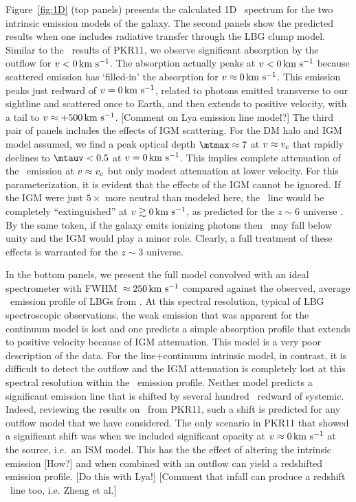 \documentclass[12pt,preprint]{aastex}
\begin{document}
Figure~\ref{fig:1D} (top panels) presents the 
calculated 1D \lya\ spectrum for the
two intrinsic emission models of the galaxy.
The second panels show the predicted results when one includes
radiative transfer through the LBG clump model.  Similar to the \mgii\
results of PKR11, we observe significant absorption by the outflow for
$v < 0\, {\rm km~s^{-1}}$.  The absorption actually peaks at $v < 0\, {\rm km~s^{-1}}$ because
scattered emission has `filled-in' the absorption for $v \approx 0
\, {\rm km~s^{-1}}$.  This emission peaks just redward of $v=0\, {\rm km~s^{-1}}$, related to
photons emitted transverse to our sightline and scattered once to
Earth, and then extends to positive velocity, with a tail to $v
\approx +500\, {\rm km~s^{-1}}$.  [Comment on Lya emission line model?]
The third pair of panels includes the effects of IGM scattering.  For
the DM halo and IGM model assumed, we find a peak optical depth
$\mtmax \approx 7$ at $v \approx v_{\rm c}$ that rapidly declines to
$\mtauv < 0.5$ at $v=0\, {\rm km~s^{-1}}$.  This implies complete attenuation of
the \lya\ emission at $v \approx v_{\rm c}$ but only modest
attenuation at lower velocity.  For this parameterization, it is evident that
the effects of the IGM cannot be ignored.  If the IGM were just $5
\times$ more neutral than modeled here, the \lya\ line would be
completely ``extinguished'' at $v \gtrsim 0 \, {\rm km~s^{-1}}$, as predicted for
the $z \sim 6$ universe \citep{zheng+10a}.  By the same token, if the
galaxy emits ionizing photons then \tmax\ may fall below unity and the
IGM would play a minor role.  Clearly, a full treatment of these
effects is warranted for the $z \sim 3$ universe.

In the bottom panels, we present the full model convolved with an
ideal spectrometer with FWHM~$\approx 250\, {\rm km~s^{-1}}$ compared against the
observed, average \lya\ emission profile of LBGs from
\cite{shapley03}.  
At this spectral resolution,
typical of LBG spectroscopic observations, the weak emission that was
apparent for the continuum model is lost and one predicts a simple
absorption profile that extends to positive velocity because of IGM
attenuation.  This model is a very poor description of the data.  
For the line+continuum intrinsic model, in contrast, it is difficult
to detect the outflow and the IGM attenuation is completely lost at
this spectral resolution within the \lya\ emission profile.
Neither model predicts a significant emission line that is shifted by
several hundred \kms\ redward of systemic.  Indeed, reviewing the
results on \mgii\ from PKR11, such a shift is predicted for any
outflow model that we have considered.  The only scenario in PKR11
that showed a significant shift was when we included significant
opacity at $v \approx 0 \, {\rm km~s^{-1}}$ at the source, i.e.\ an ISM model.
This has the the effect of altering the intrinsic emission [How?] 
and when combined with an outflow can yield a redshifted emission
profile.  [Do this with Lya!] 
[Comment that infall can produce a redshift \lya\ line too, i.e. Zheng
et al.]
\end{document}
